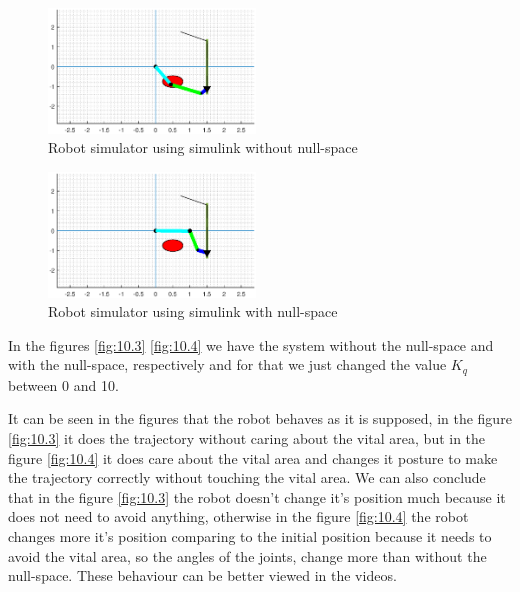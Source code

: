 \begin{figure}[H]
    \centering
    \includegraphics[width=0.49\textwidth]{imgs/10.3.eps}
    \caption{Robot simulator using simulink without null-space}
    \label{fig:10.3}
\end{figure}

\begin{figure}[H]
    \centering
    \includegraphics[width=0.49\textwidth]{imgs/10.4.eps}
    \caption{Robot simulator using simulink with null-space}
    \label{fig:10.4}
\end{figure}

In the figures \eqref{fig:10.3} \eqref{fig:10.4} we have the system without the null-space and with the null-space, respectively and for that we just changed the value $K_q$ between 0 and 10.

It can be seen in the figures that the robot behaves as it is supposed, in the figure \eqref{fig:10.3} it does the trajectory without caring about the vital area, but in the figure \eqref{fig:10.4} it does care about the vital area and changes it posture to make the trajectory correctly without touching the vital area. We can also conclude that in the figure \eqref{fig:10.3} the robot doesn't change it's position much because it does not need to avoid anything, otherwise in the figure \eqref{fig:10.4} the robot changes more it's position comparing to the initial position because it needs to avoid the vital area, so the angles of the joints, change more than without the null-space. These behaviour can be better viewed in the videos.


